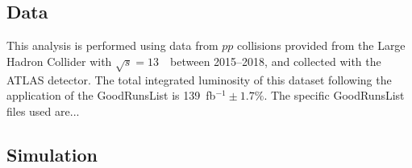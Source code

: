 \subsection{Data}

This analysis is performed using data from $pp$ collisions provided from the Large Hadron Collider with $\sqrt{s} = 13$~\TeV~between 2015--2018, and collected with the ATLAS detector. The total integrated luminosity of this dataset following the application of the GoodRunsList is 139~fb$^{-1}\pm1.7\%$. The specific GoodRunsList files used are...

\subsection{Simulation}
